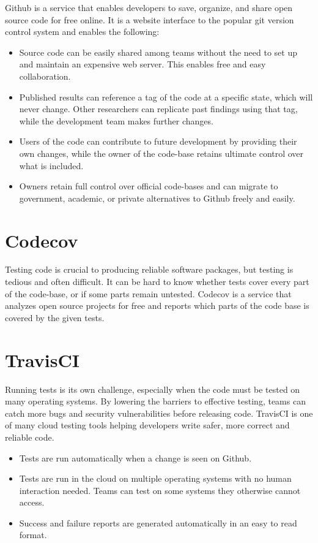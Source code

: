 \documentclass[12pt, letterpaper]{article}
\begin{document}
  Github\cite{github} is a service that enables developers to save, organize,
  and share open source code for free online. It is a website interface to the
  popular git version control system and enables the following:
  \begin{itemize}
      \item Source code can be easily shared among teams without the need to
        set up and maintain an expensive web server. This enables free and
        easy collaboration.
      \item Published results can reference a tag of the code at a specific
        state, which will never change. Other researchers can replicate past
        findings using that tag,  while the development team makes further
        changes.
      \item Users of the code can contribute to future development by providing
        their own changes, while the owner of the code-base retains ultimate
        control over what is included.
      \item Owners retain full control over official code-bases and can migrate
        to government, academic, or private alternatives to Github freely and
        easily.
  \end{itemize}

  \section*{\small Codecov}

  Testing code is crucial to producing reliable software packages,
  but testing is tedious and often difficult. It can be hard to know whether
  tests cover every part of the code-base, or if some parts remain untested.
  Codecov\cite{codecov} is a service that analyzes open source projects for
  free and reports which parts of the code base is covered by the given tests.

  \section*{\small TravisCI}

  Running tests is its own challenge, especially when the code
  must be tested on many operating systems. By lowering the barriers to
  effective testing, teams can catch more bugs and security vulnerabilities
  before releasing code. TravisCI\cite{travisci} is one of many cloud testing
  tools helping developers write safer, more correct and reliable code.
  \begin{itemize}
      \item Tests are run automatically when a change is seen on Github.
      \item Tests are run in the cloud on multiple operating systems with no
        human interaction needed. Teams can test on some systems they otherwise
        cannot access.
      \item Success and failure reports are generated automatically in an easy
        to read format.
  \end{itemize}
\end{document}
